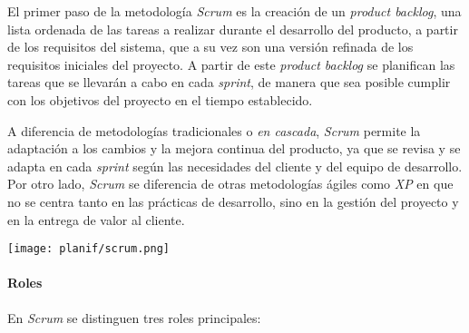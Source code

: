 El primer paso de la metodología \textit{Scrum} es la creación de un
\textit{product backlog}, una lista ordenada de las tareas a realizar durante el
desarrollo del producto, a partir de los requisitos del sistema, que a su vez
son una versión refinada de los requisitos iniciales del proyecto. A partir de
este \textit{product backlog} se planifican las tareas que se llevarán a cabo en
cada \textit{sprint}, de manera que sea posible cumplir con los objetivos del
proyecto en el tiempo establecido.

A diferencia de metodologías tradicionales o \emph{en cascada}, \textit{Scrum}
permite la adaptación a los cambios y la mejora continua del producto, ya que se
revisa y se adapta en cada \textit{sprint} según las necesidades del cliente y
del equipo de desarrollo. Por otro lado, \textit{Scrum} se diferencia de otras
metodologías ágiles como \textit{XP} en que no se centra tanto en las prácticas
de desarrollo, sino en la gestión del proyecto y en la entrega de valor al
cliente.

\begin{minipage}{\linewidth}
	\texttt{[image: planif/scrum.png]}
\end{minipage}

\paragraph{Roles}
En \textit{Scrum} se distinguen tres roles principales:

